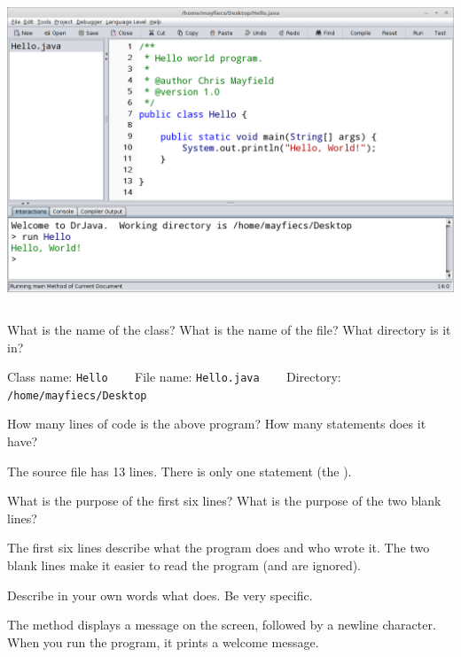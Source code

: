 
\begin{center}
\includegraphics[height=3.65in]{drjava2.png}
\end{center}




\Q What is the name of the class?
What is the name of the file?
What directory is it in?

\begin{answer}[3em]
Class name: \texttt{Hello} ~~~
File name: \texttt{Hello.java} ~~~
Directory: \texttt{/home/mayfiecs/Desktop}
\end{answer}


\Q How many lines of code is the above program?
How many statements does it have?

\begin{answer}[3em]
The source file has 13 lines.
There is only one statement (the ).
\end{answer}


\Q \label{javadoc}
What is the purpose of the first six lines?
What is the purpose of the two blank lines?

\begin{answer}
The first six lines describe what the program does and who wrote it.
The two blank lines make it easier to read the program (and are ignored).
\end{answer}


\Q \label{println}
Describe in your own words what  does.
Be very specific.

\begin{answer}
The  method displays a message on the screen, followed by a newline character.
When you run the  program, it prints a welcome message.
\end{answer}
